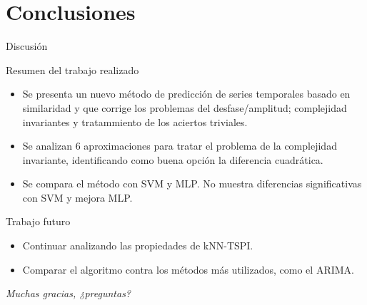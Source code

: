\documentclass[12pt, aspectratio=169]{beamer} %
\begin{document}
\section{Conclusiones}

\begin{frame}{Discusión}
  \begin{block}{Resumen del trabajo realizado}

    \begin{itemize}
    \item Se presenta un nuevo método de predicción de series temporales basado en similaridad y que corrige los problemas del desfase/amplitud; complejidad invariantes y tratammiento de los aciertos triviales.
    \item Se analizan 6 aproximaciones para tratar el problema de la complejidad invariante, identificando como buena opción la diferencia cuadrática.
    \item Se compara el método con SVM y MLP. No muestra diferencias significativas con SVM y mejora MLP.
    \end{itemize}
  \end{block}

  \begin{block}{Trabajo futuro}
    \begin{itemize}
    \item Continuar analizando las propiedades de kNN-TSPI.
    \item Comparar el algoritmo contra los métodos más utilizados, como el ARIMA.
    \end{itemize}

  \end{block}

\end{frame}


\begin{frame}{}
  \centering \Large
  \emph{Muchas gracias, ¿preguntas?}
\end{frame}
\end{document}
